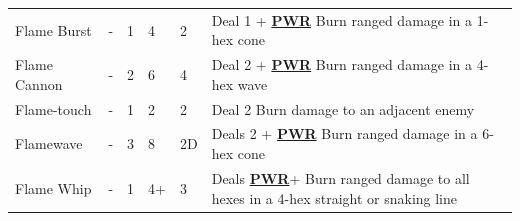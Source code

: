 \documentclass[12pt]{article}
\newcommand{\refto}[1]{\hyperlink{#1}{\textbf{#1}}}
\begin{document}
\begin{center}
\begin{tabularx}{\textwidth}{p{}p{}p{}p{}p{}p{}}
Flame Burst & - & 1 & 4 & 2 & Deal 1 + \refto{PWR} Burn ranged damage in a 1-hex cone \\
Flame Cannon & - & 2 & 6 & 4 & Deal 2 +  \refto{PWR} Burn ranged damage in a 4-hex wave\\
Flame-\newline touch & - & 1 & 2 & 2 & Deal 2 Burn damage to an adjacent enemy \\
Flamewave & - & 3 & 8 & 2D & Deals 2 + \refto{PWR} Burn ranged damage in a 6-hex cone\\
Flame Whip & - & 1 & 4+ & 3 & Deals \refto{PWR}+ Burn ranged damage to all hexes in a 4-hex straight or snaking line \\
\hline
\end{tabularx}
\end{center}

\pagebreak
\end{document}
